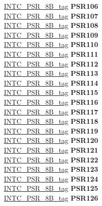 \begin{DoxyCompactItemize}
\begin{tabbing}
\>\>\mbox{\hyperlink{unionINTC__PSR__8B__tag}{INTC\_PSR\_8B\_tag}} {\bfseries PSR106}\\
\>\>\mbox{\hyperlink{unionINTC__PSR__8B__tag}{INTC\_PSR\_8B\_tag}} {\bfseries PSR107}\\
\>\>\mbox{\hyperlink{unionINTC__PSR__8B__tag}{INTC\_PSR\_8B\_tag}} {\bfseries PSR108}\\
\>\>\mbox{\hyperlink{unionINTC__PSR__8B__tag}{INTC\_PSR\_8B\_tag}} {\bfseries PSR109}\\
\>\>\mbox{\hyperlink{unionINTC__PSR__8B__tag}{INTC\_PSR\_8B\_tag}} {\bfseries PSR110}\\
\>\>\mbox{\hyperlink{unionINTC__PSR__8B__tag}{INTC\_PSR\_8B\_tag}} {\bfseries PSR111}\\
\>\>\mbox{\hyperlink{unionINTC__PSR__8B__tag}{INTC\_PSR\_8B\_tag}} {\bfseries PSR112}\\
\>\>\mbox{\hyperlink{unionINTC__PSR__8B__tag}{INTC\_PSR\_8B\_tag}} {\bfseries PSR113}\\
\>\>\mbox{\hyperlink{unionINTC__PSR__8B__tag}{INTC\_PSR\_8B\_tag}} {\bfseries PSR114}\\
\>\>\mbox{\hyperlink{unionINTC__PSR__8B__tag}{INTC\_PSR\_8B\_tag}} {\bfseries PSR115}\\
\>\>\mbox{\hyperlink{unionINTC__PSR__8B__tag}{INTC\_PSR\_8B\_tag}} {\bfseries PSR116}\\
\>\>\mbox{\hyperlink{unionINTC__PSR__8B__tag}{INTC\_PSR\_8B\_tag}} {\bfseries PSR117}\\
\>\>\mbox{\hyperlink{unionINTC__PSR__8B__tag}{INTC\_PSR\_8B\_tag}} {\bfseries PSR118}\\
\>\>\mbox{\hyperlink{unionINTC__PSR__8B__tag}{INTC\_PSR\_8B\_tag}} {\bfseries PSR119}\\
\>\>\mbox{\hyperlink{unionINTC__PSR__8B__tag}{INTC\_PSR\_8B\_tag}} {\bfseries PSR120}\\
\>\>\mbox{\hyperlink{unionINTC__PSR__8B__tag}{INTC\_PSR\_8B\_tag}} {\bfseries PSR121}\\
\>\>\mbox{\hyperlink{unionINTC__PSR__8B__tag}{INTC\_PSR\_8B\_tag}} {\bfseries PSR122}\\
\>\>\mbox{\hyperlink{unionINTC__PSR__8B__tag}{INTC\_PSR\_8B\_tag}} {\bfseries PSR123}\\
\>\>\mbox{\hyperlink{unionINTC__PSR__8B__tag}{INTC\_PSR\_8B\_tag}} {\bfseries PSR124}\\
\>\>\mbox{\hyperlink{unionINTC__PSR__8B__tag}{INTC\_PSR\_8B\_tag}} {\bfseries PSR125}\\
\>\>\mbox{\hyperlink{unionINTC__PSR__8B__tag}{INTC\_PSR\_8B\_tag}} {\bfseries PSR126}\\

\end{tabbing}
\end{DoxyCompactItemize}
